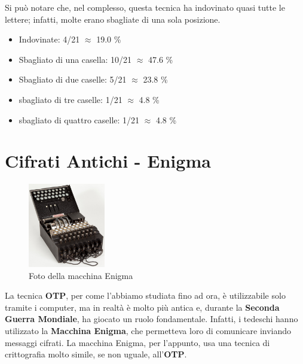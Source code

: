 \documentclass{rapport}
\begin{document}
Si può notare che, nel complesso, questa tecnica ha indovinato quasi tutte le lettere; infatti, molte erano sbagliate di una sola posizione.

\begin{itemize}
    \item Indovinate: 4/21 $\approx$ 19.0 \%
    \item Sbagliato di una casella: 10/21 $\approx$ 47.6 \%
    \item Sbagliato di due caselle: 5/21 $\approx$ 23.8 \%
    \item sbagliato di tre caselle: 1/21 $\approx$ 4.8 \%
    \item sbagliato di quattro caselle: 1/21 $\approx$ 4.8 \%
\end{itemize}























\section{Cifrati Antichi - Enigma}

\begin{figure}
    \centering
    \includegraphics[width=0.30\textwidth]{logos/2_1cripto.jpg}
    \caption*{Foto della macchina Enigma}
\end{figure}

La tecnica \textbf{OTP}, per come l'abbiamo studiata fino ad ora, è utilizzabile solo tramite i computer, ma in realtà è molto più antica e, durante la \textbf{Seconda Guerra Mondiale}, ha giocato un ruolo fondamentale. Infatti, i tedeschi hanno utilizzato la \textbf{Macchina Enigma}, che permetteva loro di comunicare inviando messaggi cifrati. La macchina Enigma, per l'appunto, usa una tecnica di crittografia molto simile, se non uguale, all'\textbf{OTP}.
\end{document}
